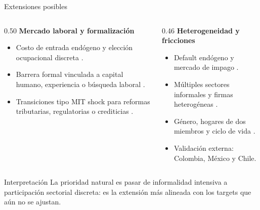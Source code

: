 \documentclass[aspectratio=169,11pt]{beamer}
\begin{document}
\begin{frame}{Extensiones posibles}
  \scriptsize
  \begin{columns}[T,onlytextwidth]
    \begin{column}{0.50\textwidth}
      \textbf{Mercado laboral y formalizaci\'on}
      \begin{itemize}
        \item Costo de entrada end\'ogeno y elecci\'on ocupacional discreta \cite{achdou2017,mollcodes}.
        \item Barrera formal vinculada a capital humano, experiencia o b\'usqueda laboral \cite{mollcodes}.
        \item Transiciones tipo MIT shock para reformas tributarias, regulatorias o crediticias \cite{mollcodes}.
      \end{itemize}
    \end{column}
    \begin{column}{0.46\textwidth}
      \textbf{Heterogeneidad y fricciones}
      \begin{itemize}
        \item Default end\'ogeno y mercado de impago \cite{mollcodes}.
        \item M\'ultiples sectores informales y firmas heterog\'eneas \cite{mollcodes}.
        \item G\'enero, hogares de dos miembros y ciclo de vida \cite{bacher2025,mollcodes}.
        \item Validaci\'on externa: Colombia, M\'exico y Chile.
      \end{itemize}
    \end{column}
  \end{columns}
  \vspace{0.15cm}
  \begin{block}{Interpretaci\'on}
    La prioridad natural es pasar de informalidad intensiva a participaci\'on sectorial discreta: es la extensi\'on m\'as alineada con los targets que a\'un no se ajustan.
  \end{block}
\end{frame}
\end{document}
